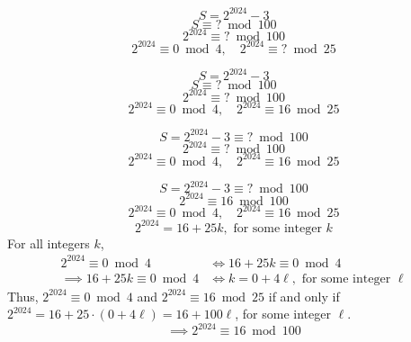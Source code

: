 \documentclass{beamer} %
\begin{document}
\begin{frame}
  \[S = 2^{2024} - 3\]
  \[S \equiv \text{?} \bmod 100\]
  \[2^{2024} \equiv \text{?} \bmod 100\]
  \[2^{2024} \equiv 0 \bmod 4, \quad 2^{2024} \equiv \text{?} \bmod 25\]
\end{frame}

\begin{frame}
  \[S = 2^{2024} - 3\]
  \[S \equiv \text{?} \bmod 100\]
  \[2^{2024} \equiv \text{?} \bmod 100\]
  \[2^{2024} \equiv 0 \bmod 4, \quad 2^{2024} \equiv 16 \bmod 25\]
\end{frame}

\begin{frame}
  \[S = 2^{2024} - 3 \equiv \text{?} \bmod 100\]
  \[2^{2024} \equiv \text{?} \bmod 100\]
  \[2^{2024} \equiv 0 \bmod 4, \quad 2^{2024} \equiv 16 \bmod 25\]
\end{frame}

\begin{frame}
  \[S = 2^{2024} - 3 \equiv \text{?} \bmod 100\]
  \[2^{2024} \equiv 16 \bmod 100\]
  \[2^{2024} \equiv 0 \bmod 4, \quad 2^{2024} \equiv 16 \bmod 25\]
  \[2^{2024} = 16 + 25k, \text{ for some integer } k\]
  For all integers $k$,
  \begin{align*}
    2^{2024} \equiv 0 \bmod 4 &\iff 16 + 25k \equiv 0 \bmod 4\\
    \implies 16 + 25k \equiv 0 \bmod 4 &\iff k = 0 + 4\ell, \text{ for some integer } \ell
  \end{align*}
  Thus, $2^{2024} \equiv 0 \bmod 4$ and $2^{2024} \equiv 16 \bmod 25$ if and only if $2^{2024} = 16 + 25 \cdot (0 + 4 \ell) = 16 + 100\ell$, for some integer $\ell$.
  \[\implies 2^{2024} \equiv 16 \bmod 100\]
\end{frame}
\end{document}
